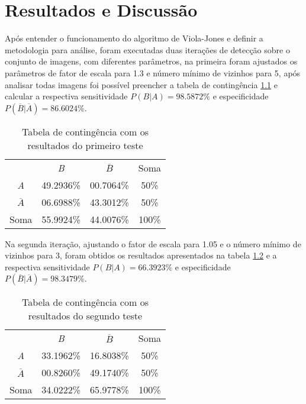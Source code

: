 \chapter{Resultados e Discussão}\label{cap:resultados}

Após entender o funcionamento do algoritmo de Viola-Jones e definir a metodologia para análise, foram executadas duas iterações de detecção sobre o conjunto de imagens, com diferentes parâmetros, na primeira foram ajustados os parâmetros de fator de escala para 1.3 e número mínimo de vizinhos para 5, após analisar todas imagens foi possível preencher a tabela de contingência \ref{tab:tabela_contingencia_teste1} e calcular a respectiva sensitividade $P(B|A) = 98.5872\%$ e especificidade $P(\overline{B} | \overline{A}) = 86.6024\%$.

\begin{table}[htbp]
    \caption{Tabela de contingência com os resultados do primeiro teste}
    \label{tab:tabela_contingencia_teste1}
    \centering
    \begin{tabular}{cccc}\hline\hline
        & \textit{B} & $\overline{B}$ & Soma\\
    \textit{A} & 49.2936\% & 00.7064\% & 50\% \\
    $\overline{A}$ & 06.6988\% & 43.3012\% & 50\% \\
    Soma & 55.9924\% & 44.0076\% & 100\% \\
    \hline\hline
    \end{tabular}
\end{table}

Na segunda iteração, ajustando o fator de escala para 1.05 e o número mínimo de vizinhos para 3, foram obtidos os resultados apresentados na tabela \ref{tab:tabela_contingencia_teste2} e a respectiva sensitividade $P(B|A) = 66.3923\%$ e especificidade $P(\overline{B} | \overline{A}) = 98.3479\%$.

\begin{table}[htbp]
    \caption{Tabela de contingência com os resultados do segundo teste}
    \label{tab:tabela_contingencia_teste2}
    \centering
    \begin{tabular}{cccc}\hline\hline
        & \textit{B} & $\overline{B}$ & Soma\\
    \textit{A}& 33.1962\% & 16.8038\% & 50\% \\
    $\overline{A}$& 00.8260\% & 49.1740\% & 50\% \\
    Soma& 34.0222\% & 65.9778\% & 100\% \\
    \hline\hline
    \end{tabular}
\end{table}

